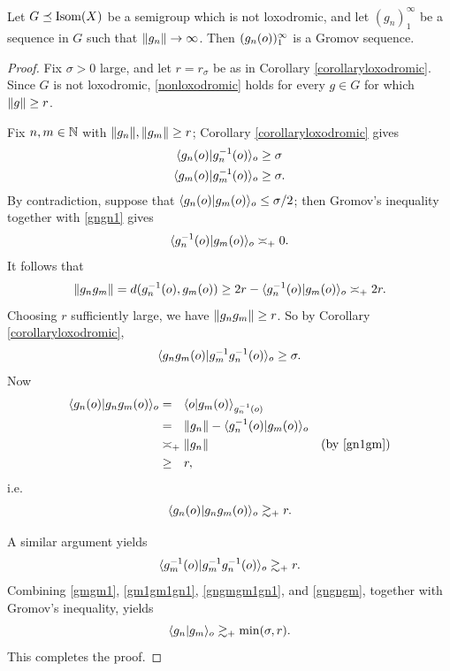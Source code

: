 \begin{lemma}\label{keylemma}
Let $G\preceq\operatorname{Isom}(X)$ be a semigroup which is not loxodromic, and let $(g_n)_1^\infty$ be a sequence in $G$ such that $\|g_n\| \to \infty$. Then $(g_n(o))_1^\infty$ is a Gromov sequence.
\end{lemma}
\begin{proof}
Fix $\sigma > 0$ large, and let $r = r_\sigma$ be as in Corollary \ref{corollaryloxodromic}. Since $G$ is not loxodromic, \eqref{nonloxodromic} holds for every $g\in G$ for which $\|g\|\geq r$.

Fix $n,m\in\N$ with $\|g_n\|,\|g_m\|\geq r$; Corollary \ref{corollaryloxodromic} gives
\begin{align} \label{gngn1}
\langle g_n(o)|g_n^{-1}(o)\rangle_o &\geq \sigma\\ \label{gmgm1}
\langle g_m(o)|g_m^{-1}(o)\rangle_o &\geq \sigma.
\end{align}
By contradiction, suppose that $\langle g_n(o)|g_m(o)\rangle_o \leq \sigma/2$; then Gromov's inequality together with \eqref{gngn1} gives
\begin{equation}
\label{gn1gm}
\langle g_n^{-1}(o)|g_m(o)\rangle_o \asymp_+ 0.
\end{equation}
It follows that
\[
\|g_n g_m\| = d(g_n^{-1}(o),g_m(o)) \geq 2r - \langle g_n^{-1}(o)|g_m(o)\rangle_o \asymp_+ 2r.
\]
Choosing $r$ sufficiently large, we have $\|g_n g_m\| \geq r$. So by Corollary \ref{corollaryloxodromic},
\begin{equation}
\label{gngmgm1gn1}
\langle g_n g_m(o)|g_m^{-1} g_n^{-1}(o)\rangle_o \geq \sigma.
\end{equation}
Now
\begin{align*}
\lb g_n(\zero)|g_n g_m(\zero)\rb_\zero &=_\pt \lb \zero|g_m(\zero)\rb_{g_n^{-1}(\zero)}\\
&=_\pt \dogo{g_n} - \lb g_n^{-1}(\zero)|g_m(\zero)\rb_\zero\\
&\asymp_\plus \dogo{g_n} \by{\eqref{gn1gm}}\\
&\geq_\pt r,
\end{align*}
i.e.
\begin{equation}
\label{gngngm}
\langle g_n(o)|g_n g_m(o)\rangle_o \gtrsim_+ r.
\end{equation}

A similar argument yields
\begin{equation}
\label{gm1gm1gn1}
\langle g_m^{-1}(o)|g_m^{-1} g_n^{-1}(o)\rangle_o \gtrsim_+ r.
\end{equation}
Combining \eqref{gmgm1}, \eqref{gm1gm1gn1}, \eqref{gngmgm1gn1}, and \eqref{gngngm}, together with Gromov's inequality, yields
\[
\langle g_n|g_m\rangle_o \gtrsim_+ \min(\sigma,r).
\]
This completes the proof.
\end{proof}

